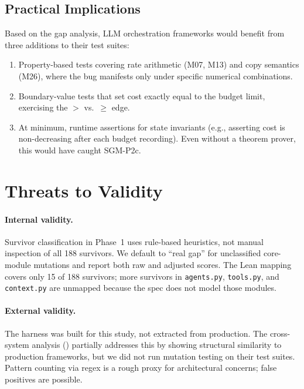 \documentclass[11pt,a4paper]{article}
\begin{document}
\subsection{Practical Implications}

Based on the gap analysis, LLM orchestration frameworks would benefit
from three additions to their test suites:

\begin{enumerate}[nosep]
  \item Property-based tests covering rate arithmetic (M07, M13)
    and copy semantics (M26), where the bug manifests only under
    specific numerical combinations.
  \item Boundary-value tests that set cost exactly equal to the
    budget limit, exercising the $>$ vs.\ $\geq$ edge.
  \item At minimum, runtime assertions for state invariants
    (e.g., asserting cost is non-decreasing after each budget
    recording). Even without a theorem prover, this would have
    caught SGM-P2c.
\end{enumerate}

\section{Threats to Validity}
\label{sec:threats}

\paragraph{Internal validity.}
Survivor classification in Phase~1 uses rule-based heuristics,
not manual inspection of all 188 survivors. We default to ``real
gap'' for unclassified core-module mutations and report both raw
and adjusted scores. The Lean mapping covers only 15 of 188
survivors; more survivors in \texttt{agents.py}, \texttt{tools.py},
and \texttt{context.py} are unmapped because the spec does not model
those modules.

\paragraph{External validity.}
The harness was built for this study, not extracted from production.
The cross-system analysis () partially
addresses this by showing structural similarity to production
frameworks, but we did not run mutation testing on their test suites.
Pattern counting via regex is a rough proxy for architectural
concerns; false positives are possible.
\end{document}

